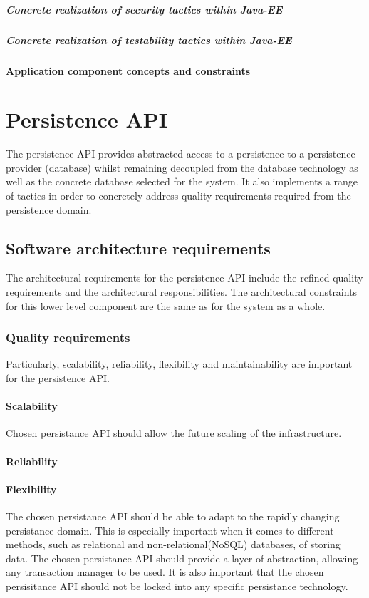 \documentclass[a4paper,12pt]{report}
\begin{document}
\subparagraph {Concrete realization of security tactics  within Java-EE}
\hfill \break

\subparagraph {Concrete realization of testability tactics  within Java-EE}
\hfill \break

\paragraph {Application component concepts and constraints}


\section {Persistence API}
The persistence API provides abstracted access to a persistence to a persistence provider (database)
whilst remaining decoupled from the database technology as well as the concrete database selected
for the system. It also implements a range of tactics in order to concretely address quality requirements required from the persistence domain.

\subsection {Software architecture requirements}
The architectural requirements for the persistence API include the refined quality requirements and
the architectural responsibilities. The architectural constraints for this lower level component are
the same as for the system as a whole.

\subsubsection {Quality requirements}
Particularly, scalability, reliability, flexibility and maintainability are important for the persistence API.

\paragraph {Scalability}
\hfill \break
Chosen persistance API should allow the future scaling of the infrastructure.

\paragraph {Reliability}

\paragraph {Flexibility}
\hfill \break
The chosen persistance API should be able to adapt to the rapidly changing persistance domain. This is especially important when it comes to different methods, such as relational and non-relational(NoSQL) databases, of storing data. \newline 
The chosen persistance API should provide a layer of abstraction, allowing any transaction manager to be used. It is also important that the chosen persisitance API should not be locked into any specific persistance technology.
\end{document}
